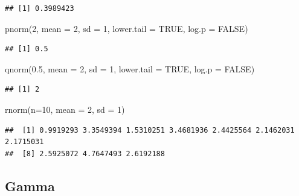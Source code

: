 \documentclass[
]{book}
\newenvironment{Shaded}{\begin{snugshade}}{\end{snugshade}}
\newcommand{\AttributeTok}[1]{\textcolor[rgb]{0.77,0.63,0.00}{#1}}
\newcommand{\ConstantTok}[1]{\textcolor[rgb]{0.00,0.00,0.00}{#1}}
\newcommand{\DecValTok}[1]{\textcolor[rgb]{0.00,0.00,0.81}{#1}}
\newcommand{\FloatTok}[1]{\textcolor[rgb]{0.00,0.00,0.81}{#1}}
\newcommand{\FunctionTok}[1]{\textcolor[rgb]{0.00,0.00,0.00}{#1}}
\newcommand{\NormalTok}[1]{#1}
\begin{document}
\begin{verbatim}
## [1] 0.3989423
\end{verbatim}

\begin{Shaded}
\begin{Highlighting}[]
\FunctionTok{pnorm}\NormalTok{(}\DecValTok{2}\NormalTok{, }\AttributeTok{mean =} \DecValTok{2}\NormalTok{, }\AttributeTok{sd =} \DecValTok{1}\NormalTok{, }\AttributeTok{lower.tail =} \ConstantTok{TRUE}\NormalTok{, }\AttributeTok{log.p =} \ConstantTok{FALSE}\NormalTok{)}
\end{Highlighting}
\end{Shaded}

\begin{verbatim}
## [1] 0.5
\end{verbatim}

\begin{Shaded}
\begin{Highlighting}[]
\FunctionTok{qnorm}\NormalTok{(}\FloatTok{0.5}\NormalTok{, }\AttributeTok{mean =} \DecValTok{2}\NormalTok{, }\AttributeTok{sd =} \DecValTok{1}\NormalTok{, }\AttributeTok{lower.tail =} \ConstantTok{TRUE}\NormalTok{, }\AttributeTok{log.p =} \ConstantTok{FALSE}\NormalTok{)}
\end{Highlighting}
\end{Shaded}

\begin{verbatim}
## [1] 2
\end{verbatim}

\begin{Shaded}
\begin{Highlighting}[]
\FunctionTok{rnorm}\NormalTok{(}\AttributeTok{n=}\DecValTok{10}\NormalTok{, }\AttributeTok{mean =} \DecValTok{2}\NormalTok{, }\AttributeTok{sd =} \DecValTok{1}\NormalTok{)}
\end{Highlighting}
\end{Shaded}

\begin{verbatim}
##  [1] 0.9919293 3.3549394 1.5310251 3.4681936 2.4425564 2.1462031 2.1715031
##  [8] 2.5925072 4.7647493 2.6192188
\end{verbatim}

\hypertarget{gamma}{%
\subsection{Gamma}\label{gamma}}
\end{document}
